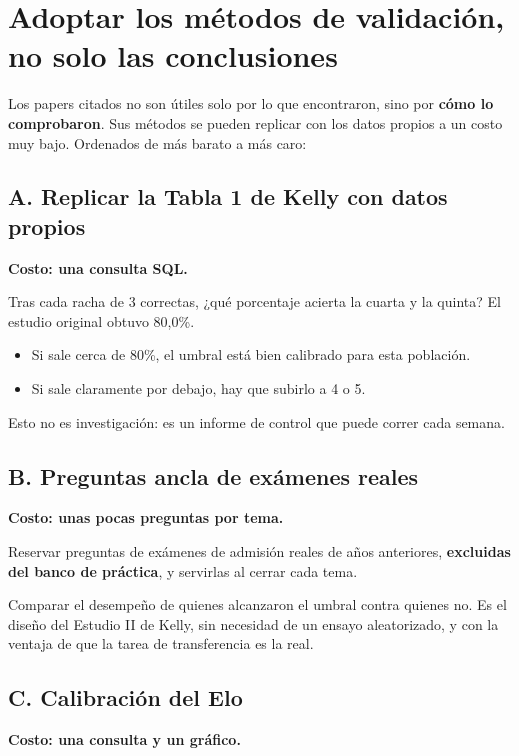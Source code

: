 \documentclass[11pt,a4paper]{article}
\begin{document}
\section{Adoptar los métodos de validación, no solo las conclusiones}

Los papers citados no son útiles solo por lo que encontraron, sino por \textbf{cómo lo comprobaron}. Sus métodos se pueden replicar con los datos propios a un costo muy bajo. Ordenados de más barato a más caro:

\subsection{A. Replicar la Tabla 1 de Kelly con datos propios}

\textbf{Costo: una consulta SQL.}

Tras cada racha de 3 correctas, ¿qué porcentaje acierta la cuarta y la quinta? El estudio original obtuvo 80{,}0\%.

\begin{itemize}
\item Si sale cerca de 80\%, el umbral está bien calibrado para esta población.
\item Si sale claramente por debajo, hay que subirlo a 4 o 5.
\end{itemize}

Esto no es investigación: es un informe de control que puede correr cada semana.

\subsection{B. Preguntas ancla de exámenes reales}

\textbf{Costo: unas pocas preguntas por tema.}

Reservar preguntas de exámenes de admisión reales de años anteriores, \textbf{excluidas del banco de práctica}, y servirlas al cerrar cada tema.

Comparar el desempeño de quienes alcanzaron el umbral contra quienes no. Es el diseño del Estudio II de Kelly, sin necesidad de un ensayo aleatorizado, y con la ventaja de que la tarea de transferencia es la real.

\subsection{C. Calibración del Elo}

\textbf{Costo: una consulta y un gráfico.}
\end{document}
